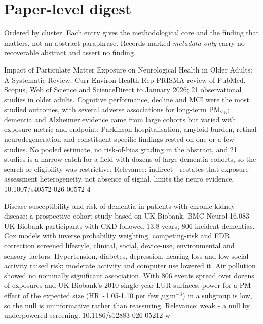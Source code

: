 \documentclass[10pt]{article}
\begin{document}
\vspace{4mm}

\par{}\baselineskip{}\baselineskip
\section*{\sffamily\bfseries\color{Deep}Paper-level digest}
\vspace{-1.5mm}{\color{Amber}\rule{\linewidth}{1.1pt}}\vspace{2.5mm}

{\fontsize{7.4}{9}\selectfont\color{Slate}Ordered by cluster. Each entry gives the
methodological core and the finding that matters, not an abstract paraphrase. Records
marked \textit{metadata only} carry no recoverable abstract and assert no finding.\par}


{Impact of Particulate Matter Exposure on Neurological Health in Older Adults: A Systematic Review.}
{Curr Environ Health Rep}
{PRISMA review of PubMed, Scopus, Web of Science and ScienceDirect to January 2026; 21 observational studies in older adults. Cognitive performance, decline and MCI were the most studied outcomes, with several adverse associations for long-term PM$_{2.5}$; dementia and Alzheimer evidence came from large cohorts but varied with exposure metric and endpoint; Parkinson hospitalisation, amyloid burden, retinal neurodegeneration and constituent-specific findings rested on one or a few studies. No pooled estimate, no risk-of-bias grading in the abstract, and 21 studies is a narrow catch for a field with dozens of large dementia cohorts, so the search or eligibility was restrictive. Relevance: indirect - restates that exposure-assessment heterogeneity, not absence of signal, limits the neuro evidence.}
{10.1007/s40572-026-00572-4}

{Disease susceptibility and risk of dementia in patients with chronic kidney disease: a prospective cohort study based on UK Biobank.}
{BMC Neurol}
{16,083 UK Biobank participants with CKD followed 13.8 years; 806 incident dementias. Cox models with inverse probability weighting, competing-risk and FDR correction screened lifestyle, clinical, social, device-use, environmental and sensory factors. Hypertension, diabetes, depression, hearing loss and low social activity raised risk; moderate activity and computer use lowered it. Air pollution showed no nominally significant association. With 806 events spread over dozens of exposures and UK Biobank's 2010 single-year LUR surfaces, power for a PM effect of the expected size (HR \textasciitilde{}1.05-1.10 per few $\mu$g\,m$^{-3}$) in a subgroup is low, so the null is uninformative rather than reassuring. Relevance: weak - a null by underpowered screening.}
{10.1186/s12883-026-05212-w}
\end{document}
